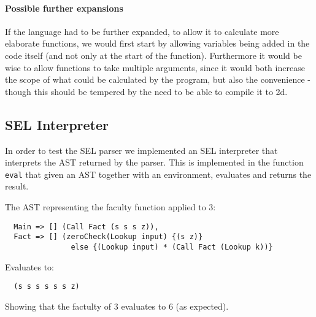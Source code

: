 \paragraph{Possible further expansions}
If the language had to be further expanded, to allow it to calculate
more elaborate functions, we would first start by allowing variables
being added in the code itself (and not only at the start of the
function). Furthermore it would be wise to allow functions to take
multiple arguments, since it would both increase the scope of what
could be calculated by the program, but also the convenience - though
this should be tempered by the need to be able to compile it to
2d.


\subsection{SEL Interpreter}
In order to test the SEL parser we implemented an SEL interpreter
that interprets the AST returned by the parser. This is implemented
in the function \texttt{eval} that given an AST together with an
environment, evaluates and returns the result.

\begin{samepage}
  \begin{exmp}
    The AST representing the faculty function applied to $3$:
\begin{verbatim}
  Main => [] (Call Fact (s s s z)),
  Fact => [] (zeroCheck(Lookup input) {(s z)}
               else {(Lookup input) * (Call Fact (Lookup k))}
\end{verbatim}
    Evaluates to:
\begin{verbatim}
  (s s s s s s z)
\end{verbatim}
    Showing that the factulty of $3$ evaluates to $6$ (as expected).
  \end{exmp}
\end{samepage}


